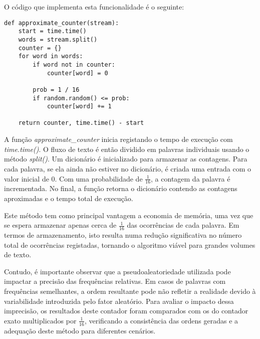 \documentclass[shortpaper, portugues, times, mirror]{revdetua}
\begin{document}
O código que implementa esta funcionalidade é o seguinte:
\begin{lstlisting}
def approximate_counter(stream):
    start = time.time()
    words = stream.split()
    counter = {}
    for word in words:
        if word not in counter:
            counter[word] = 0

        prob = 1 / 16
        if random.random() <= prob:
            counter[word] += 1

    return counter, time.time() - start
\end{lstlisting}
A função \textit{approximate\_counter} inicia registando o tempo de execução com \textit{time.time()}. O fluxo de texto é então dividido em palavras individuais usando o método \textit{split()}. Um dicionário é inicializado para armazenar as contagens. Para cada palavra, se ela ainda não estiver no dicionário, é criada uma entrada com o valor inicial de 0. Com uma probabilidade de \( \frac{1}{16} \), a contagem da palavra é incrementada. No final, a função retorna o dicionário contendo as contagens aproximadas e o tempo total de execução.

Este método tem como principal vantagem a economia de memória, uma vez que se espera armazenar apenas cerca de \( \frac{1}{16} \) das ocorrências de cada palavra. Em termos de armazenamento, isto resulta numa redução significativa no número total de ocorrências registadas, tornando o algoritmo viável para grandes volumes de texto.

Contudo, é importante observar que a pseudoaleatoriedade utilizada pode impactar a precisão das frequências relativas. Em casos de palavras com frequências semelhantes, a ordem resultante pode não refletir a realidade devido à variabilidade introduzida pelo fator aleatório. Para avaliar o impacto dessa imprecisão, os resultados deste contador foram comparados com os do contador exato multiplicados por \( \frac{1}{16} \), verificando a consistência das ordens geradas e a adequação deste método para diferentes cenários.
\end{document}
